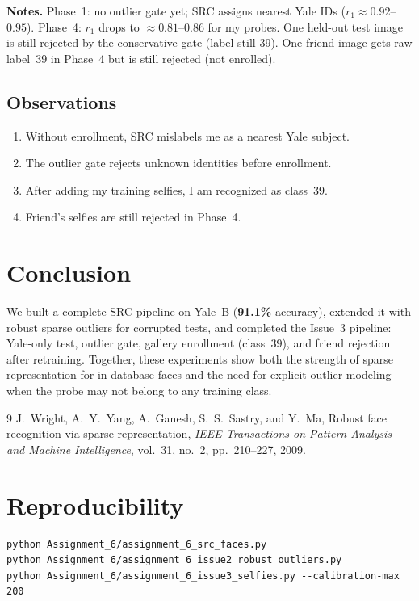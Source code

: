 \documentclass[11pt,a4paper]{article}
\begin{document}
\noindent\textbf{Notes.} Phase~1: no outlier gate yet; SRC assigns nearest Yale IDs ($r_1\approx 0.92$--$0.95$).
Phase~4: $r_1$ drops to $\approx 0.81$--$0.86$ for my probes. One held-out test image is still rejected by the conservative gate (label still 39).
One friend image gets raw label~39 in Phase~4 but is still rejected (not enrolled).

\subsection{Observations}

\begin{enumerate}
  \item Without enrollment, SRC mislabels me as a nearest Yale subject.
  \item The outlier gate rejects unknown identities before enrollment.
  \item After adding my training selfies, I am recognized as class~39.
  \item Friend's selfies are still rejected in Phase~4.
\end{enumerate}

\section{Conclusion}

We built a complete SRC pipeline on Yale~B (\textbf{91.1\%} accuracy), extended it with robust sparse outliers
for corrupted tests, and completed the Issue~3 pipeline: Yale-only test, outlier gate, gallery enrollment (class~39), and friend rejection after retraining.
Together, these experiments show both the strength of sparse representation for in-database faces and the
need for explicit outlier modeling when the probe may not belong to any training class.

\begin{thebibliography}{9}
J.~Wright, A.~Y.~Yang, A.~Ganesh, S.~S.~Sastry, and Y.~Ma,
\newblock Robust face recognition via sparse representation,
\newblock \emph{IEEE Transactions on Pattern Analysis and Machine Intelligence},
vol.~31, no.~2, pp.~210--227, 2009.
\end{thebibliography}

\appendix
\section{Reproducibility}

\begin{verbatim}
python Assignment_6/assignment_6_src_faces.py
python Assignment_6/assignment_6_issue2_robust_outliers.py
python Assignment_6/assignment_6_issue3_selfies.py --calibration-max 200
\end{verbatim}
\end{document}
